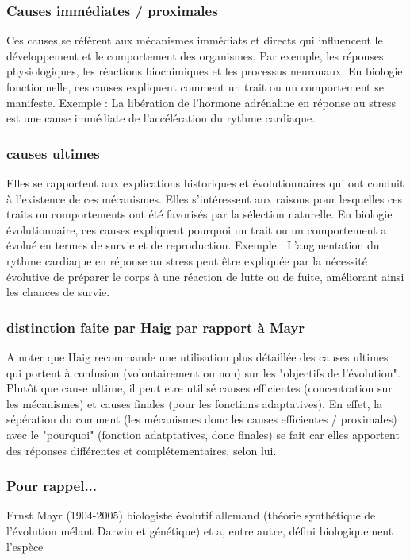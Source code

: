 \documentclass[twocolumn,10pt]{article} %
\begin{document}
            \subsubsection{Causes immédiates / proximales}
               Ces causes se réfèrent aux mécanismes immédiats et directs qui influencent le développement et le comportement des organismes. Par exemple, les réponses physiologiques, les réactions biochimiques et les processus neuronaux.
               En biologie fonctionnelle, ces causes expliquent comment un trait ou un comportement se manifeste.
               Exemple : La libération de l'hormone adrénaline en réponse au stress est une cause immédiate de l'accélération du rythme cardiaque.
   
               \subsubsection{causes ultimes}
               Elles se rapportent aux explications historiques et évolutionnaires qui ont conduit à l'existence de ces mécanismes. Elles s'intéressent aux raisons pour lesquelles ces traits ou comportements ont été favorisés par la sélection naturelle.
               En biologie évolutionnaire, ces causes expliquent pourquoi un trait ou un comportement a évolué en termes de survie et de reproduction.
               Exemple : L'augmentation du rythme cardiaque en réponse au stress peut être expliquée par la nécessité évolutive de préparer le corps à une réaction de lutte ou de fuite, améliorant ainsi les chances de survie.
   
               
               \subsubsection{distinction faite par Haig par rapport à Mayr}
               A noter que Haig recommande une utilisation plus détaillée des causes ultimes qui portent à confusion (volontairement ou non) sur les "objectifs de l'évolution". 
               Plutôt que cause ultime, il peut etre utilisé causes efficientes (concentration sur les mécanismes) et causes finales (pour les fonctions adaptatives).
               En effet, la sépération du comment (les mécanismes donc les causes efficientes / proximales) avec le "pourquoi" (fonction adatptatives, donc finales) 
               se fait car elles apportent des réponses différentes et complétementaires, selon lui. 
   
               \subsubsection{Pour rappel...}
               Ernst Mayr (1904-2005) biologiste évolutif allemand (théorie synthétique de l'évolution mélant Darwin et génétique) et a, entre autre, défini biologiquement l'espèce
   
\end{document}
